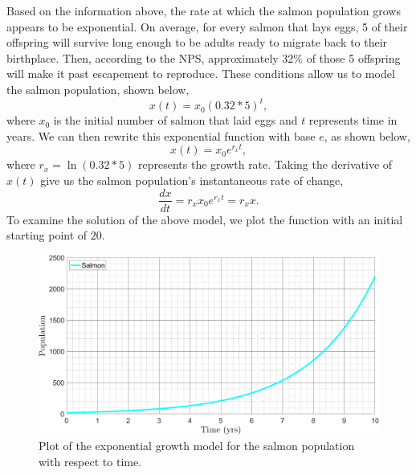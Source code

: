 Based on the information above, the rate at which the salmon population grows appears to be exponential.
On average, for every salmon that lays eggs, 5 of their offspring will survive long enough to be adults ready to migrate back to their birthplace. Then, according to the NPS, approximately 32\% of those 5 offspring will make it past escapement to reproduce. These conditions allow us to model the salmon population, shown below,
\begin{equation}\label{eq:fishexpbase5}
    x(t) = x_0(0.32*5)^t,
\end{equation}
where $x_0$ is the initial number of salmon that laid eggs and $t$ represents time in years. We can then rewrite this exponential function with base $e$, as shown below,
\begin{equation}\label{eq:fishexp}
    x(t) = x_0e^{r_xt},
\end{equation}
where $r_x=\ln{(0.32*5)}$ represents the growth rate. Taking the derivative of $x(t)$ give us the salmon population's instantaneous rate of change,
\begin{equation}\label{eq:fishexpdif}
    \frac{dx}{dt} = r_xx_0e^{r_xt} = r_xx.
\end{equation}
To examine the solution of the above model, we plot the function with an initial starting point of $20$.
\begin{figure}[H]
    \centering
    \includegraphics[width=14cm]{Pictures/Salmon Pop/SalmonExpo.png}
    \caption{\singlespacing
    Plot of the exponential growth model for the salmon population with respect to time.}
    \label{fig:salmonexpzoom}
\end{figure}
